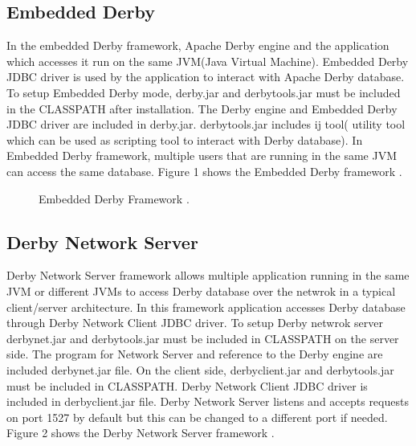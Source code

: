 \documentclass[9pt,twocolumn,twoside]{../../styles/osajnl}
\begin{document}
\subsection{Embedded Derby}
In the embedded Derby framework, Apache Derby engine and the
application which accesses it run on the same JVM(Java Virtual
Machine). Embedded Derby JDBC driver is used by the application to
interact with Apache Derby database. To setup Embedded Derby mode,
derby.jar and derbytools.jar must be included in the CLASSPATH after
installation. The Derby engine and Embedded Derby JDBC driver are
included in derby.jar. derbytools.jar includes ij tool( utility tool
which can be used as scripting tool to interact with Derby
database). In Embedded Derby framework, multiple users that are
running in the same JVM can access the same database. Figure 1 shows
the Embedded Derby framework \cite {www-derbytutorial}.

\begin{figure}[htbp]
\caption{Embedded Derby Framework  \cite {www-derbytutorial}.}
\end{figure}


\subsection{Derby Network Server}
Derby Network Server framework allows multiple application running
in the same JVM or different JVMs to access Derby database over the
netwrok in a typical client/server architecture. In this framework
application accesses Derby database through Derby Network Client JDBC
driver. To setup Derby netwrok server derbynet.jar and derbytools.jar
must be included in CLASSPATH on the server side. The program for
Network Server and reference to the Derby engine are included
derbynet.jar file. On the client side, derbyclient.jar and
derbytools.jar must be included in CLASSPATH. Derby Network Client
JDBC driver is included in derbyclient.jar file. Derby Network Server
listens and accepts requests on port 1527 by default but this can be
changed to a different port if needed. Figure 2 shows the Derby
Network Server framework \cite {www-derbytutorial}.
\end{document}
